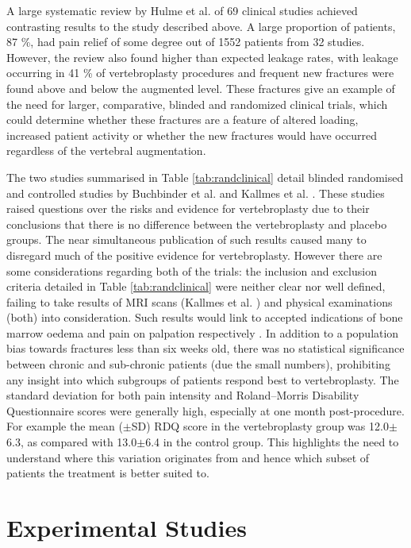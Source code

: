 A large systematic review by Hulme et al. \cite{Hulme2006} of 69 clinical
studies achieved contrasting results to the study described above. A
large proportion of patients, 87 \%, had pain relief of some degree out
of 1552 patients from 32 studies. However, the review also found higher
than expected leakage rates, with leakage occurring in 41 \% of
vertebroplasty procedures and frequent new fractures were found above
and below the augmented level. These fractures give an example of the
need for larger, comparative, blinded and randomized clinical trials,
which could determine whether these fractures are a feature of altered
loading, increased patient activity or whether the new fractures would
have occurred regardless of the vertebral augmentation.

The two studies summarised in Table \ref{tab:randclinical} detail blinded
randomised and
controlled studies by Buchbinder et al. \cite{Buchbinder2009} and Kallmes et
al.
\cite{Kallmes2009}. These studies raised questions over the risks and evidence
for
vertebroplasty due to their conclusions that there is no difference
between the vertebroplasty and placebo groups. The near simultaneous
publication of such results caused many to disregard much of the
positive evidence \cite{Muijs2011} for vertebroplasty. However there are some
considerations regarding both of the trials: the inclusion and exclusion
criteria detailed in Table \ref{tab:randclinical} were neither clear nor well
defined,
failing to take results of MRI scans (Kallmes et al. \cite{Kallmes2009}) and
physical examinations (both) into consideration. Such results would link
to accepted indications of bone marrow oedema and pain on palpation
respectively \cite{Jay2013}. In addition to a population bias towards
fractures less than six weeks old, there was no statistical significance
between chronic and sub-chronic patients (due the small numbers),
prohibiting any insight into which subgroups of patients respond best to
vertebroplasty. The standard deviation for both pain intensity and
Roland--Morris Disability Questionnaire scores were generally high,
especially at one month post-procedure. For example the mean ($\pm$SD) RDQ score in the vertebroplasty group was 12.0$\pm$6.3, as compared with 13.0$\pm$6.4 in the control group. This highlights the need to
understand where this variation originates from and hence which subset
of patients the treatment is better suited to.

\section{Experimental Studies}\label{experimental-studies}

